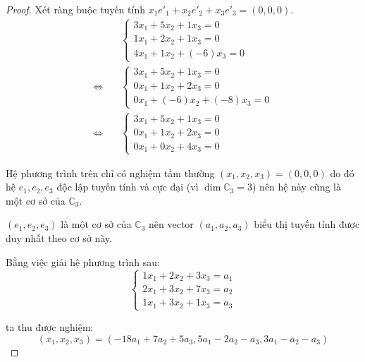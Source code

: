 \begin{proof}
    \bigskip
    Xét ràng buộc tuyến tính $x_{1}e'_{1} + x_{2}e'_{2} + x_{3}e'_{3} = (0, 0, 0)$.
    \begingroup
    \allowdisplaybreaks
    \begin{align*}
                             & \begin{cases}
                                   3x_{1} + 5x_{2} + 1x_{3} = 0 \\
                                   1x_{1} + 2x_{2} + 1x_{3} = 0 \\
                                   4x_{1} + 1x_{2} + (-6)x_{3} = 0
                               \end{cases} \\
        \Longleftrightarrow\quad &
        \begin{cases}
            3x_{1} + 5x_{2} + 1x_{3} = 0 \\
            0x_{1} + 1x_{2} + 2x_{3} = 0 \\
            0x_{1} + (-6)x_{2} + (-8)x_{3} = 0
        \end{cases}                     \\
        \Longleftrightarrow\quad &
        \begin{cases}
            3x_{1} + 5x_{2} + 1x_{3} = 0 \\
            0x_{1} + 1x_{2} + 2x_{3} = 0 \\
            0x_{1} + 0x_{2} + 4x_{3} = 0
        \end{cases}
    \end{align*}
    \endgroup
    
    Hệ phương trình trên chỉ có nghiệm tầm thường $(x_{1}, x_{2}, x_{3}) = (0, 0, 0)$ do đó hệ $e_{1}, e_{2}, e_{3}$ độc lập tuyến tính và cực đại (vì $\dim\mathbb{C}_{3} = 3$) nên hệ này cũng là một cơ sở của $\mathbb{C}_{3}$.

    $(e_{1}, e_{2}, e_{3})$ là một cơ sở của $\mathbb{C}_{3}$ nên vector $(a_{1}, a_{2}, a_{3})$ biểu thị tuyến tính được duy nhất theo cơ sở này.
    
    Bằng việc giải hệ phương trình sau:
    \[
        \begin{cases}
            1x_{1} + 2x_{2} + 3x_{3} = a_{1} \\
            2x_{1} + 3x_{2} + 7x_{3} = a_{2} \\
            1x_{1} + 3x_{2} + 1x_{3} = a_{3}
        \end{cases}
    \]
    
    ta thu được nghiệm:
    \[
        (x_{1}, x_{2}, x_{3}) = (-18a_{1} + 7a_{2} + 5a_{3}, 5a_{1} - 2a_{2} - a_{3}, 3a_{1} - a_{2} - a_{3})
    \]
    

\end{proof}
